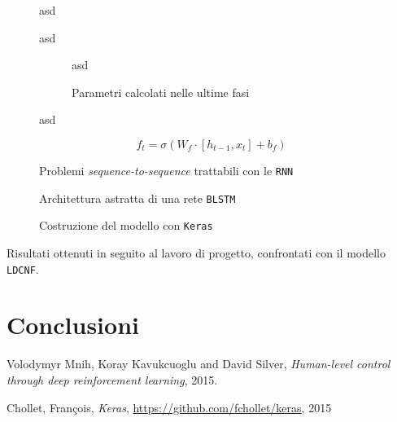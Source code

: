 \documentclass[twoside,twocolumn,10pt]{extarticle}
\theoremstyle{definition}
\begin{document}
	\begin{figure}[h]
		\centering
		\caption{asd}
		\label{fig:unroll}
	\end{figure}

	\begin{figure}[h]
		\centering
		\caption{asd}
		\label{fig:lstm}
	\end{figure}

	\begin{figure}[h]
		\centering
		\begin{subfigure}[b]{.496\textwidth}
			\caption{asd}
		\end{subfigure}
		\begin{subfigure}[b]{.496\textwidth}
			\caption{Parametri calcolati nelle ultime fasi}
		\end{subfigure}
		\caption{asd}
		\label{fig:parmap}
	\end{figure}
	
	\begin{equation}\label{eq:ft}
		f_t = \sigma(W_f \cdot [h_{t - 1}, x_t] + b_f)
	\end{equation}
	
	\begin{figure}[h]
		\centering
		\caption{Problemi \textit{sequence-to-sequence} trattabili con le \texttt{RNN}}
		\label{fig:seqs}
	\end{figure}
	\begin{figure}
		\centering
		\caption{Architettura astratta di una rete \texttt{BLSTM}}
		\label{fig:blstm}
	\end{figure}
	\begin{figure}[ht!]
		\centering
		\caption{Costruzione del modello con \texttt{Keras}}
		\label{fig:modelcode}
	\end{figure}
	\begin{table}[]
		\centering
		\caption{Risultati ottenuti in seguito al lavoro di progetto, confrontati con il modello \texttt{LDCNF}.}
		\label{tab:results}
		
	\end{table}
	
	\section{Conclusioni}	
	
\begin{thebibliography}{99}	
		Volodymyr Mnih, Koray Kavukcuoglu and David Silver,
		\newblock \emph{Human-level control through deep reinforcement learning},
		2015.
		
		Chollet, Fran\c{c}ois,
		\newblock \emph{Keras},
		\url{https://github.com/fchollet/keras},
		2015

\end{thebibliography}
\end{document}
